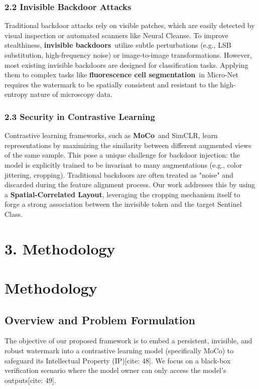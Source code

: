 \documentclass[10pt,twocolumn,letterpaper]{article}
\begin{document}
\subsubsection{\textbf{2.2 Invisible Backdoor Attacks}}

Traditional backdoor attacks rely on visible patches, which are easily detected by visual inspection or automated scanners like Neural Cleanse. To improve stealthiness, \textbf{\textbf{invisible backdoors}} utilize subtle perturbations (e.g., LSB substitution, high-frequency noise) or image-to-image transformations. However, most existing invisible backdoors are designed for classification tasks. Applying them to complex tasks like \textbf{\textbf{fluorescence cell segmentation}} in Micro-Net requires the watermark to be spatially consistent and resistant to the high-entropy nature of microscopy data.

\subsubsection{\textbf{2.3 Security in Contrastive Learning}}

Contrastive learning frameworks, such as \textbf{\textbf{MoCo}} and SimCLR, learn representations by maximizing the similarity between different augmented views of the same sample. This pose a unique challenge for backdoor injection: the model is explicitly trained to be invariant to many augmentations (e.g., color jittering, cropping). Traditional backdoors are often treated as "noise" and discarded during the feature alignment process. Our work addresses this by using a \textbf{\textbf{Spatial-Correlated Layout}}, leveraging the cropping mechanism itself to forge a strong association between the invisible token and the target Sentinel Class.

\section{\textbf{3. Methodology}}
\section{Methodology}

\subsection{Overview and Problem Formulation}
The objective of our proposed framework is to embed a persistent, invisible, and robust watermark into a contrastive learning model (specifically MoCo) to safeguard its Intellectual Property (IP)[cite: 48]. We focus on a black-box verification scenario where the model owner can only access the model's outputs[cite: 49]. 
\end{document}
